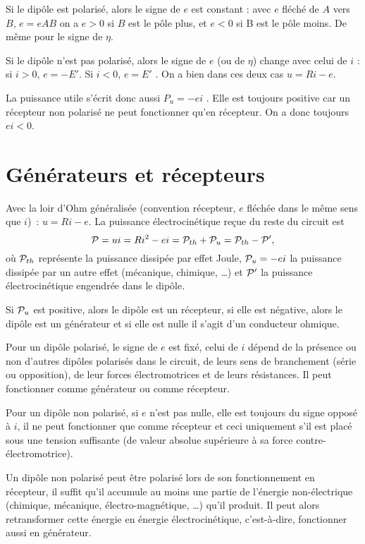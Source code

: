 Si le dipôle est polarisé, alors le signe de \(e\) est constant : avec \(e\) fléché de \(A\) vers \(B\), \(e = eAB\) on a \(e > 0\) si \(B\) est le pôle plus, et \(e < 0\) si B est le pôle moins. De même pour le signe de \(\eta\).

Si le dipôle n'est pas polarisé, alors le signe de \(e\) (ou de \(\eta\)) change avec celui de \(i\) : si \(i > 0\), \(e = -E'\). Si \(i < 0\), \(e = E'\) . On a bien dans ces deux cas \(u = R i - e\).

La puissance utile s'écrit donc aussi \(P_u = - e i\) . Elle est toujours positive car un récepteur non polarisé ne peut fonctionner qu'en récepteur. On a donc toujours \(ei < 0\).

\section{Générateurs et récepteurs}
Avec la loir d'Ohm généralisée (convention récepteur, \(e\) fléchée dans le même sens que \(i\))~: \(u=Ri-e\). La puissance électrocinétique reçue du reste du circuit est
\begin{equation}
  \P = ui = Ri^2 - ei = \P_{th}+ \P_u = \P_{th} - \P',
\end{equation}
où \(\P_{th}\) représente la puissance dissipée par effet Joule, \(\P_u=-ei\) la puissance dissipée par un autre effet (mécanique, chimique, \ldots{}) et \(\P'\) la puissance électrocinétique engendrée dans le dipôle.

Si \(\P_u\) est positive, alors le dipôle est un récepteur, si elle est négative, alors le dipôle est un générateur et si elle est nulle il s'agit d'un conducteur ohmique.

Pour un dipôle polarisé, le signe de \(e\) est fixé, celui de \(i\) dépend de la présence ou non d'autres dipôles polarisés dans le circuit, de leurs sens de branchement (série ou opposition), de leur forces électromotrices et de leurs résistances. Il peut fonctionner comme générateur ou comme récepteur.

Pour un dipôle non polarisé, si \(e\) n'est pas nulle, elle est toujours du signe opposé à \(i\), il ne peut fonctionner que comme récepteur et ceci uniquement s'il est placé sous une tension suffisante (de valeur absolue supérieure à sa force contre-électromotrice).

Un dipôle non polarisé peut être polarisé lors de son fonctionnement en récepteur, il suffit qu'il accumule au moins une partie de l'énergie non-électrique (chimique, mécanique, électro-magnétique, \ldots{}) qu'il produit. Il peut alors retransformer cette énergie en énergie électrocinétique, c'est-à-dire, fonctionner aussi en générateur.

